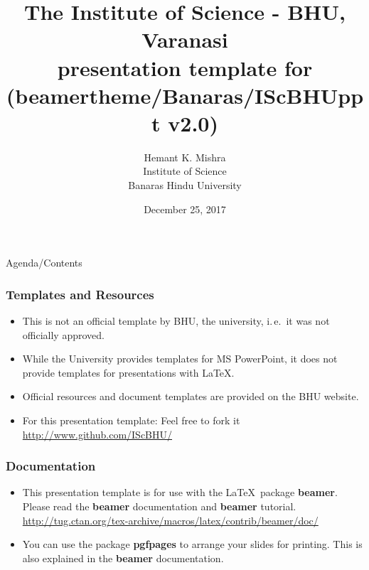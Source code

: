 \documentclass[]{beamer} %
\author[]{\small{Hemant K. Mishra} \\ \tiny{Institute of Science} \\ \tiny{Banaras Hindu University} }%
\title[]{The Institute of Science - BHU, Varanasi \\ presentation template for \LaTeXe \\ (beamertheme/Banaras/IScBHUppt v2.0)}
\date{December 25, 2017} %
\begin{document}
\frame{\maketitle}
\begin{frame}{Agenda/Contents}%
\tableofcontents
\end{frame}






\begin{frame}
\frametitle{Templates and Resources}
	\begin{itemize}
	\item This is not an official template by BHU, the university,	i.\,e.\ it was not officially approved.
	\item While the University provides templates for MS PowerPoint, it does not provide templates for presentations with \LaTeX.
	\item Official resources and document templates are provided on the BHU website.
    \item For this presentation template: Feel free to fork it\\ 	
    {\small \url{http://www.github.com/IScBHU/}} \\
	\end{itemize}
\end{frame}

\begin{frame}
\frametitle{Documentation}
	\begin{itemize}
	\item This presentation template is for use
	with the \LaTeX\ package \textbf{beamer}.
	Please read the \textbf{beamer} documentation
	and  \textbf{beamer} tutorial.\\	
    {\tiny \url{http://tug.ctan.org/tex-archive/macros/latex/contrib/beamer/doc/}}
	\item You can use the package \textbf{pgfpages}
	to arrange your slides for printing. This is also explained
	in the \textbf{beamer} documentation.
	\end{itemize}
\end{frame}
\end{document}
